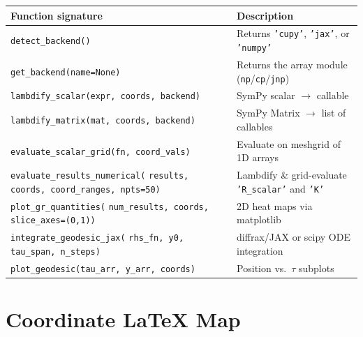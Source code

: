 \documentclass[11pt,a4paper]{article}
\newcommand{\code}[1]{\texttt{\small#1}}
\begin{document}
\begin{center}
\begin{longtable}{p{5.5cm}p{8.5cm}}
  \toprule
  Function signature & Description \\
  \midrule\endhead
  \code{detect\_backend()} & Returns \code{'cupy'}, \code{'jax'}, or \code{'numpy'} \\[4pt]
  \code{get\_backend(name=None)} & Returns the array module (\code{np}/\code{cp}/\code{jnp}) \\[4pt]
  \code{lambdify\_scalar(expr, coords, backend)} & SymPy scalar $\to$ callable \\[4pt]
  \code{lambdify\_matrix(mat, coords, backend)} & SymPy Matrix $\to$ list of callables \\[4pt]
  \code{evaluate\_scalar\_grid(fn, coord\_vals)} & Evaluate on meshgrid of 1D arrays \\[4pt]
  \code{evaluate\_results\_numerical(}\newline
    \quad\code{results, coords, coord\_ranges, npts=50)}
    & Lambdify \& grid-evaluate \code{'R\_scalar'} and \code{'K'} \\[4pt]
  \code{plot\_gr\_quantities(}\newline
    \quad\code{num\_results, coords, slice\_axes=(0,1))}
    & 2D heat maps via matplotlib \\[4pt]
  \code{integrate\_geodesic\_jax(}\newline
    \quad\code{rhs\_fn, y0, tau\_span, n\_steps)}
    & diffrax/JAX or scipy ODE integration \\[4pt]
  \code{plot\_geodesic(tau\_arr, y\_arr, coords)} & Position vs.\ $\tau$ subplots \\
  \bottomrule
\end{longtable}
\end{center}

\section{Coordinate LaTeX Map}
\label{app:coordmap}
\end{document}
